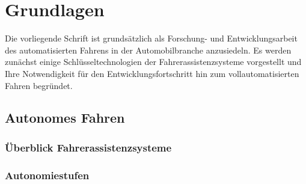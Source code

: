 \chapter{Grundlagen} \label{cha:grundlagen}
Die vorliegende Schrift ist grundsätzlich als Forschung- und Entwicklungsarbeit des automatisierten Fahrens in der Automobilbranche anzusiedeln. Es werden zunächst einige Schlüsseltechnologien der Fahrerassistenzsysteme vorgestellt und Ihre Notwendigkeit für den Entwicklungsfortschritt hin zum vollautomatisierten Fahren begründet.


\section{Autonomes Fahren} \label{sec:AutonomesFahren}

\subsection{Überblick Fahrerassistenzsysteme} \label{subsec:FAS}
\lipsum[1-1]
\subsection{Autonomiestufen} \label{Autonomiestufen}%
\lipsum[1-1]


